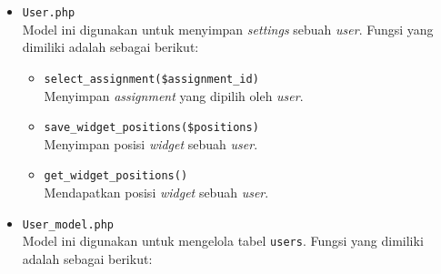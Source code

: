 \documentclass[a4paper,twoside]{article}
\begin{document}
\begin{enumerate}
\begin{itemize}
\begin{itemize}
			            \item \verb|User.php| \\
			                  Model ini digunakan untuk menyimpan \textit{settings} sebuah \textit{user}. Fungsi yang dimiliki adalah sebagai berikut:

			                  \begin{itemize}
				                  \item \verb|select_assignment($assignment_id)| \\
				                        Menyimpan \textit{assignment} yang dipilih oleh \textit{user}.
				                  \item \verb|save_widget_positions($positions)| \\
				                        Menyimpan posisi \textit{widget} sebuah \textit{user}.
				                  \item \verb|get_widget_positions()| \\
				                        Mendapatkan posisi \textit{widget} sebuah \textit{user}.
			                  \end{itemize}

			            \item \verb|User_model.php| \\
			                  Model ini digunakan untuk mengelola tabel \verb|users|. Fungsi yang dimiliki adalah sebagai berikut:


\end{itemize}
\end{itemize}
\end{enumerate}
\end{document}

